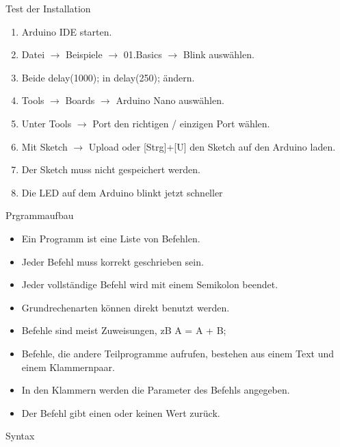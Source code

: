 \documentclass[12pt]{beamer}
\begin{document}
\begin{frame}{Test der Installation}
\begin{enumerate}
\item Arduino IDE starten.
\item Datei $\rightarrow$ Beispiele $\rightarrow$ 01.Basics $\rightarrow$ Blink auswählen.
\item Beide delay(1000); in delay(250); ändern.
\item Tools $\rightarrow$ Boards $\rightarrow$ Arduino Nano auswählen.
\item Unter Tools $\rightarrow$ Port den richtigen / einzigen Port wählen.
\item Mit Sketch $\rightarrow$ Upload oder [Strg]+[U] den Sketch auf den Arduino laden.
\item Der Sketch muss nicht gespeichert werden.
\item Die LED auf dem Arduino blinkt jetzt schneller
\end{enumerate}
\end{frame}

\begin{frame}{Prgrammaufbau}
\begin{itemize}
\item Ein Programm ist eine Liste von Befehlen.
\item Jeder Befehl muss korrekt geschrieben sein.
\item Jeder vollständige Befehl wird mit einem Semikolon beendet.
\item Grundrechenarten können direkt benutzt werden.
\item Befehle sind meist Zuweisungen, zB A = A + B;
\item Befehle, die andere Teilprogramme aufrufen, bestehen aus einem Text und einem Klammernpaar.
\item In den Klammern werden die Parameter des Befehls angegeben.
\item Der Befehl gibt einen oder keinen Wert zurück.
\end{itemize}
\end{frame}

\begin{frame}{Syntax}
\end{frame}
\end{document}
